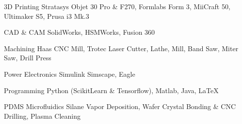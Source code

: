 


\begin{cvskills}

\cvskill
{3D Printing} %
{Stratasys Objet 30 Pro \& F270, Formlabs Form 3, MiiCraft 50, Ultimaker S5, Prusa i3 Mk.3} %

\cvskill
{CAD \& CAM} %
{SolidWorks, HSMWorks, Fusion 360} %




\cvskill
{Machining}
{Haas CNC Mill, Trotec Laser Cutter, Lathe, Mill, Band Saw, Miter Saw, Drill Press}

\cvskill
{Power Electronics}
{Simulink Simscape, Eagle}

\cvskill
{Programming} %
{Python (ScikitLearn \& Tensorflow), Matlab, Java, LaTeX} %

\cvskill
{PDMS Microfluidics}
{Silane Vapor Deposition, Wafer Crystal Bonding \& CNC Drilling, Plasma Cleaning}






\end{cvskills}